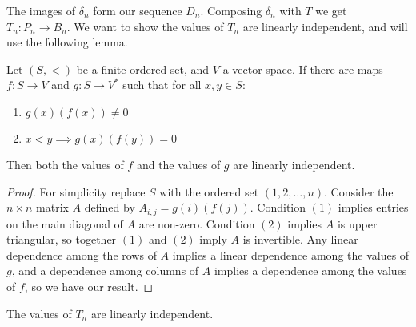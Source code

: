 \documentclass[11pt]{article} %
\begin{document}
The images of $\delta_n$ form our sequence $D_n$. Composing $\delta_n$ with $T$ we get $T_n:P_n \rightarrow B_n$. We want to show the values of $T_n$ are linearly independent, and will use the following lemma.

\begin{lemma} Let $(S,<)$ be a finite ordered set, and $V$ a vector space. If there are maps $f:S \rightarrow V$ and $g:S \rightarrow V^*$ such that for all $x,y \in S$:
\begin{enumerate}
\item $g(x)(f(x)) \neq 0$
\item $x<y \implies g(x)(f(y))=0$
\end{enumerate}
Then both the values of $f$ and the values of $g$ are linearly independent.
\end{lemma}
\begin{proof}
For simplicity replace $S$ with the ordered set $(1,2,\dots,n)$. Consider the $n \times n$ matrix $A$ defined by $A_{i,j}=g(i)(f(j))$. Condition $(1)$ implies entries on the main diagonal of $A$ are non-zero. Condition $(2)$ implies $A$ is upper triangular, so together $(1)$ and $(2)$ imply $A$ is invertible. Any linear dependence among the rows of $A$ implies a linear dependence among the values of $g$, and a dependence among columns of $A$ implies a dependence among the values of $f$, so we have our result.
\end{proof}
\begin{prop}
The values of $T_n$ are linearly independent. 
\end{prop}
\end{document}

